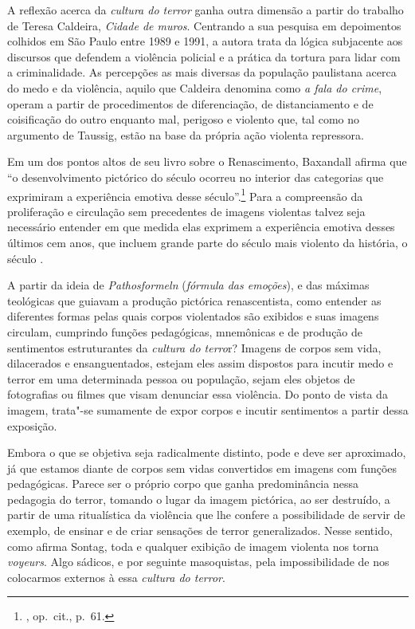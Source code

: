 A reflexão acerca da \emph{cultura do terror} ganha outra dimensão a
partir do trabalho de Teresa Caldeira, \emph{Cidade de muros}. Centrando
a sua pesquisa em depoimentos colhidos em São Paulo entre 1989 e 1991, a
autora trata da lógica subjacente aos discursos que defendem a
violência policial e a prática da tortura para lidar com a
criminalidade. As percepções as mais diversas da população paulistana
acerca do medo e da violência, aquilo que Caldeira denomina como \emph{a
fala do crime}, operam a partir de procedimentos de diferenciação, de
distanciamento e de coisificação do outro enquanto mal, perigoso e
violento que, tal como no argumento de Taussig, estão na base da própria
ação violenta repressora.

\asterisc

Em um dos pontos altos de seu livro sobre o Renascimento, Baxandall
afirma que ``o desenvolvimento pictórico do século  ocorreu no
interior das categorias que exprimiram a experiência emotiva desse
século''.\footnote{, op.~cit., p.~61.} Para a compreensão da
proliferação e circulação sem precedentes de imagens violentas talvez
seja necessário entender em que medida elas exprimem a experiência
emotiva desses últimos cem anos, que incluem grande parte do século
mais violento da história, o século .

A partir da ideia de \emph{Pathosformeln} (\emph{fórmula das emoções}),
e das máximas teológicas que guiavam a produção pictórica renascentista,
como entender as diferentes formas pelas quais corpos violentados são
exibidos e suas imagens circulam, cumprindo funções pedagógicas,
mnemônicas e de produção de sentimentos estruturantes da \emph{cultura
do terro}r? Imagens de corpos sem vida, dilacerados e ensanguentados,
estejam eles assim dispostos para incutir medo e terror em uma
determinada pessoa ou população, sejam eles objetos de fotografias ou
filmes que visam denunciar essa violência. Do ponto de vista da imagem,
trata"-se sumamente de expor corpos e incutir sentimentos a partir dessa
exposição.

Embora o que se objetiva seja radicalmente distinto, pode e deve ser
aproximado, já que estamos diante de corpos sem vidas convertidos em
imagens com funções pedagógicas. Parece ser o próprio corpo que ganha
predominância nessa pedagogia do terror, tomando o lugar da imagem
pictórica, ao ser destruído, a partir de uma ritualística da violência
que lhe confere a possibilidade de servir de exemplo, de ensinar e de
criar sensações de terror generalizados. Nesse sentido, como afirma
Sontag, toda e qualquer exibição de imagem violenta nos torna \emph{voyeurs}.
Algo sádicos, e por seguinte masoquistas, pela impossibilidade de nos
colocarmos externos à essa \emph{cultura do terror}.

